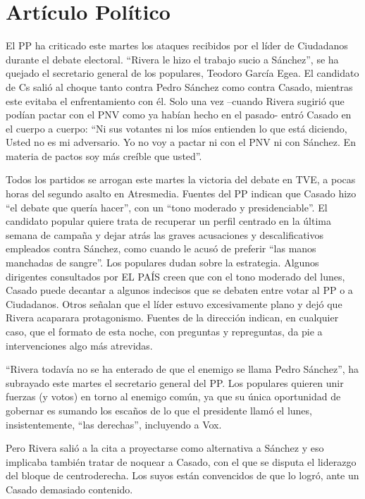 \section{Artículo Político}
\label{cap:sec:articulopolitico}

El PP ha criticado este martes los ataques recibidos por el líder de Ciudadanos durante el debate electoral. ``Rivera le hizo el trabajo sucio a Sánchez'', se ha quejado el secretario general de los populares, Teodoro García Egea. El candidato de Cs salió al choque tanto contra Pedro Sánchez como contra Casado, mientras este evitaba el enfrentamiento con él. Solo una vez –cuando Rivera sugirió que podían pactar con el PNV como ya habían hecho en el pasado- entró Casado en el cuerpo a cuerpo: ``Ni sus votantes ni los míos entienden lo que está diciendo, Usted no es mi adversario. Yo no voy a pactar ni con el PNV ni con Sánchez. En materia de pactos soy más creíble que usted''.

Todos los partidos se arrogan este martes la victoria del debate en TVE, a pocas horas del segundo asalto en Atresmedia. Fuentes del PP indican que Casado hizo “el debate que quería hacer”, con un ``tono moderado y presidenciable''. El candidato popular quiere trata de recuperar un perfil centrado en la última semana de campaña y dejar atrás las graves acusaciones y descalificativos empleados contra Sánchez, como cuando le acusó de preferir ``las manos manchadas de sangre''. Los populares dudan sobre la estrategia. Algunos dirigentes consultados por EL PAÍS creen que con el tono moderado del lunes, Casado puede decantar a algunos indecisos que se debaten entre votar al PP o a Ciudadanos. Otros señalan que el líder estuvo excesivamente plano y dejó que Rivera acaparara protagonismo. Fuentes de la dirección indican, en cualquier caso, que el formato de esta noche, con preguntas y repreguntas, da pie a intervenciones algo más atrevidas.

``Rivera todavía no se ha enterado de que el enemigo se llama Pedro Sánchez'', ha subrayado este martes el secretario general del PP. Los populares quieren unir fuerzas (y votos) en torno al enemigo común, ya que su única oportunidad de gobernar es sumando los escaños de lo que el presidente llamó el lunes, insistentemente, ``las derechas'', incluyendo a Vox.

Pero Rivera salió a la cita a proyectarse como alternativa a Sánchez y eso implicaba también tratar de noquear a Casado, con el que se disputa el liderazgo del bloque de centroderecha. Los suyos están convencidos de que lo logró, ante un Casado demasiado contenido.

